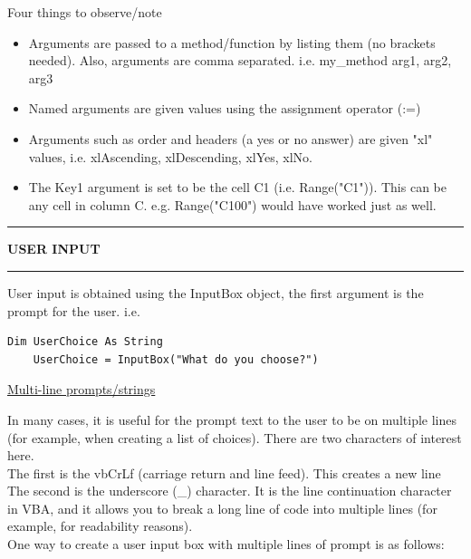 \documentclass[8pt]{extarticle}
\newcommand{\heading}[1]{%
    \noindent
    \rule{\linewidth}{0.4pt}
    \begin{center}
        \vspace{-1ex}
        \textbf{#1}        
        \vspace{-2.5ex}
    \end{center}
    \rule{\linewidth}{0.4pt}
}
\begin{document}
\begin{multicols}{3}
\begin{tcolorbox}[colback=gray!10, colframe=gray!50]
Four things to observe/note
\begin{itemize}
    \item Arguments are passed to a method/function by listing them (no brackets needed). Also, arguments are comma separated. i.e.
    my\_method arg1, arg2, arg3
    \item Named arguments are given values using the assignment operator (:=)
    \item Arguments such as order and headers (a yes or no answer) are given "xl" values, i.e. xlAscending, xlDescending, xlYes, xlNo.
    \item The Key1 argument is set to be the cell C1 (i.e. Range("C1")). This can be any cell in column C. e.g. Range("C100") would have worked just as well.
\end{itemize}
\end{tcolorbox}

\heading{USER INPUT}

User input is obtained using the InputBox object, the first argument is the prompt for the user. i.e.

\begin{lstlisting}[style=vba]
    Dim UserChoice As String
    UserChoice = InputBox("What do you choose?")   
\end{lstlisting}

\begin{center}
    \underline{Multi-line prompts/strings}
\end{center}

In many cases, it is useful for the prompt text to the user to be on multiple lines (for example, when creating a list of choices). There are two characters of interest here. \\

The first is the vbCrLf (carriage return and line feed). This creates a new line \\

The second is the underscore (\_) character. It is the line continuation character in VBA, and it allows you to break a long line of code into multiple lines (for example, for readability reasons).\\

One way to create a user input box with multiple lines of prompt is as follows:


\end{multicols}
\end{document}
